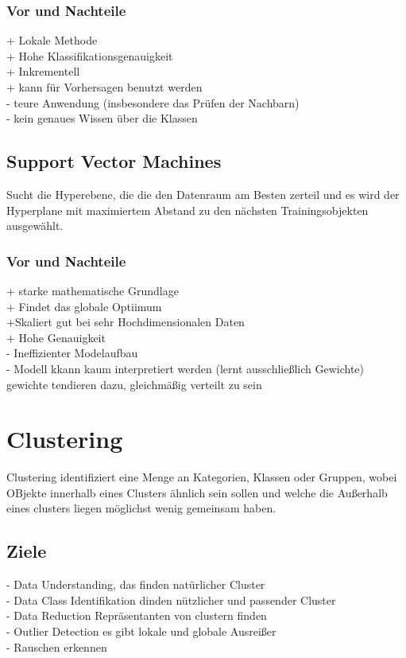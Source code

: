 \documentclass[a4paper]{scrartcl}
\begin{document}
\subsubsection{Vor und Nachteile}

+ Lokale Methode\\
+ Hohe Klassifikationsgenauigkeit\\
+ Inkrementell\\
+ kann für Vorhersagen benutzt werden\\
- teure Anwendung (insbesondere das Prüfen der Nachbarn)\\
- kein genaues Wissen über die Klassen\\

\subsection{Support Vector Machines}
Sucht die Hyperebene, die die den Datenraum am Besten zerteil und es wird der Hyperplane mit maximiertem Abstand zu den nächsten Trainingsobjekten ausgewählt.
\subsubsection{Vor und Nachteile}

+ starke mathematische Grundlage\\
+ Findet das globale Optiimum\\
+Skaliert gut bei sehr Hochdimensionalen Daten\\
+ Hohe Genauigkeit\\
- Ineffizienter Modelaufbau\\
- Modell kkann kaum interpretiert werden (lernt ausschließlich Gewichte) gewichte tendieren dazu, gleichmäßig verteilt zu sein\\

\section{Clustering}
Clustering identifiziert eine Menge an Kategorien, Klassen oder Gruppen, wobei OBjekte innerhalb eines Clusters ähnlich sein sollen und welche die Außerhalb eines clusters liegen möglichst wenig gemeinsam haben.
\subsection{Ziele}
- Data Understanding, das finden natürlicher Cluster\\
- Data Class Identifikation dinden nützlicher und passender Cluster\\
- Data Reduction  Repräsentanten von clustern finden\\
- Outlier Detection es gibt lokale und globale Ausreißer\\
- Rauschen erkennen\\
\end{document}
